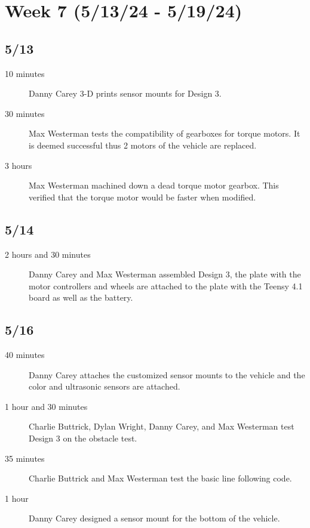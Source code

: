 \documentclass[11pt]{report}
\begin{document}
\section{Week 7 (5/13/24 - 5/19/24)}
\begin{adjustwidth}{0.5cm}{0cm}
\subsection*{5/13}
\begin{greylineformat}
\begin{description}
    \item [10 minutes] Danny Carey 3-D prints sensor mounts for Design 3. 
    \item [30 minutes] Max Westerman tests the compatibility of gearboxes for torque motors. It is deemed successful thus 2 motors of the vehicle are replaced. 
    \item [3 hours] Max Westerman machined down a dead torque motor gearbox. This verified that the torque motor would be faster when modified. 
\end{description}\end{greylineformat}

\vspace{-2.1em}\subsection*{5/14}
\begin{greylineformat}
\begin{description}
    \item [2 hours and 30 minutes] Danny Carey and Max Westerman assembled Design 3, the plate with the motor controllers and wheels are attached to the plate with the Teensy 4.1 board as well as the battery. 
\end{description}\end{greylineformat}

\vspace{-2.1em}\subsection*{5/16}
\begin{greylineformat}
\begin{description}
    \item [40 minutes] Danny Carey attaches the customized sensor mounts to the vehicle and the color and ultrasonic sensors are attached. 
    \item [1 hour and 30 minutes] Charlie Buttrick, Dylan Wright, Danny Carey, and Max Westerman test Design 3 on the obstacle test. 
    \item [35 minutes] Charlie Buttrick and Max Westerman test the basic line following code. 
    \item [1 hour] Danny Carey designed a sensor mount for the bottom of the vehicle. 
\end{description}\end{greylineformat}


\end{adjustwidth}
\end{document}
